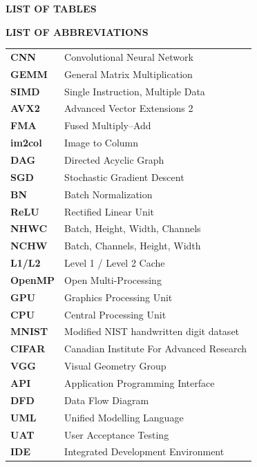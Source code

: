 \documentclass[12pt,oneside,a4paper]{report}
\newcommand{\prelimheading}[1]{%
  \begin{center}
    {\Large\bfseries\color{mnPrimary} #1}
  \end{center}
  \vspace{1cm}%
}
\begin{document}
\vspace{0.8cm}

\prelimheading{LIST OF TABLES}
\listoftables

\newpage

\vspace*{0.5cm}
\prelimheading{LIST OF ABBREVIATIONS}

\noindent
\begin{tabular}{@{}>{\raggedright\arraybackslash\bfseries}p{2.5cm}>{\raggedright\arraybackslash}p{10.0cm}@{}}
CNN & Convolutional Neural Network \\
GEMM & General Matrix Multiplication \\
SIMD & Single Instruction, Multiple Data \\
AVX2 & Advanced Vector Extensions 2 \\
FMA & Fused Multiply--Add \\
im2col & Image to Column \\
DAG & Directed Acyclic Graph \\
SGD & Stochastic Gradient Descent \\
BN & Batch Normalization \\
ReLU & Rectified Linear Unit \\
NHWC & Batch, Height, Width, Channels \\
NCHW & Batch, Channels, Height, Width \\
L1/L2 & Level 1 / Level 2 Cache \\
OpenMP & Open Multi-Processing \\
GPU & Graphics Processing Unit \\
CPU & Central Processing Unit \\
MNIST & Modified NIST handwritten digit dataset \\
CIFAR & Canadian Institute For Advanced Research \\
VGG & Visual Geometry Group \\
API & Application Programming Interface \\
DFD & Data Flow Diagram \\
UML & Unified Modelling Language \\
UAT & User Acceptance Testing \\
IDE & Integrated Development Environment \\
\end{tabular}
\end{document}
